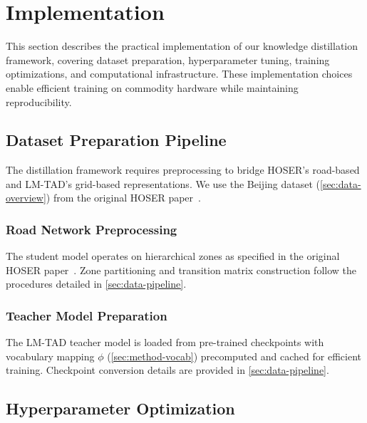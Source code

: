 
\section{Implementation}
\label{sec:implementation}

This section describes the practical implementation of our knowledge distillation framework, covering dataset preparation, hyperparameter tuning, training optimizations, and computational infrastructure. These implementation choices enable efficient training on commodity hardware while maintaining reproducibility.

\subsection{Dataset Preparation Pipeline}
\label{sec:impl-dataset-prep}

The distillation framework requires preprocessing to bridge HOSER's road-based and LM-TAD's grid-based representations. We use the Beijing dataset (\autoref{sec:data-overview}) from the original HOSER paper~\cite{caoHolisticSemanticRepresentation2025}.

\subsubsection{Road Network Preprocessing}

The student model operates on hierarchical zones as specified in the original HOSER paper~\cite{caoHolisticSemanticRepresentation2025}. Zone partitioning and transition matrix construction follow the procedures detailed in \autoref{sec:data-pipeline}.

\subsubsection{Teacher Model Preparation}

The LM-TAD teacher model is loaded from pre-trained checkpoints with vocabulary mapping $\phi$ (\autoref{sec:method-vocab}) precomputed and cached for efficient training. Checkpoint conversion details are provided in \autoref{sec:data-pipeline}.

\subsection{Hyperparameter Optimization}
\label{sec:impl-hparam}

